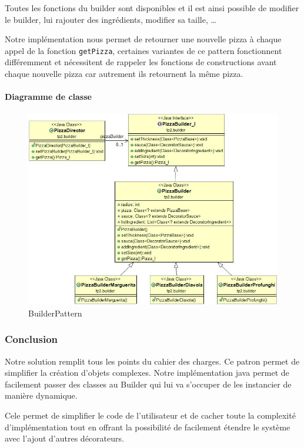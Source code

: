 \documentclass[french,]{article}
\let\oldparagraph\paragraph
\renewcommand{\paragraph}[1]{\oldparagraph{#1}\mbox{}}
\begin{document}
Toutes les fonctions du builder sont disponibles et il est ainsi
possible de modifier le builder, lui rajouter des ingrédients, modifier
sa taille, \ldots{}

Notre implémentation nous permet de retourner une nouvelle pizza à
chaque appel de la fonction \texttt{getPizza}, certaines variantes de ce
pattern fonctionnent différemment et nécessitent de rappeler les
fonctions de constructions avant chaque nouvelle pizza car autrement ils
retournent la même pizza.

\paragraph{Diagramme de classe}\label{diagramme-de-classe-1}

\begin{figure}[htbp]
\centering
\includegraphics{Builder.jpg}
\caption{BuilderPattern}
\end{figure}

\subsubsection{Conclusion}\label{conclusion}

Notre solution remplit tous les points du cahier des charges. Ce patron
permet de simplifier la création d'objets complexes. Notre
implémentation java permet de facilement passer des classes au Builder
qui lui va s'occuper de les instancier de manière dynamique.

Cele permet de simplifier le code de l'utilisateur et de cacher toute la
complexité d'implémentation tout en offrant la possibilité de facilement
étendre le système avec l'ajout d'autres décorateurs.
\end{document}

